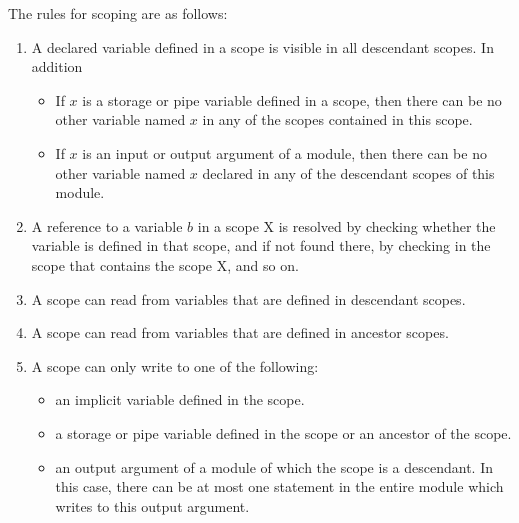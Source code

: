 \documentclass{article}
\begin{document}
The rules for scoping are as follows:
\begin{enumerate}
\item A declared variable defined in a scope is visible
in all descendant scopes. In addition
\begin{itemize}
\item If $x$ is a storage or pipe variable defined in a scope, then
there can be no other variable named $x$ in any of the scopes
contained in this scope.
\item If $x$ is an input or output argument of a module, then
there can be no other variable named $x$ declared in any of
the descendant scopes of this module.
\end{itemize}
\item A reference to a variable $b$ in a scope X is resolved by checking
whether the variable is defined in that scope, and if not found there,
by checking in the scope that contains the scope X, and so on.
\item A scope can read from variables that are defined in descendant
scopes.  
\item A scope can read from variables that are defined in ancestor scopes.
\item A scope can only write to one of the following:
\begin{itemize}
\item an implicit variable defined in the scope.
\item a storage or pipe variable defined in the scope or an ancestor
of the scope.
\item an output argument of a module of which the scope is a descendant.
In this case, there can be at most one statement in the entire module
which writes to this output argument.
\end{itemize}
\end{enumerate}
\end{document}

